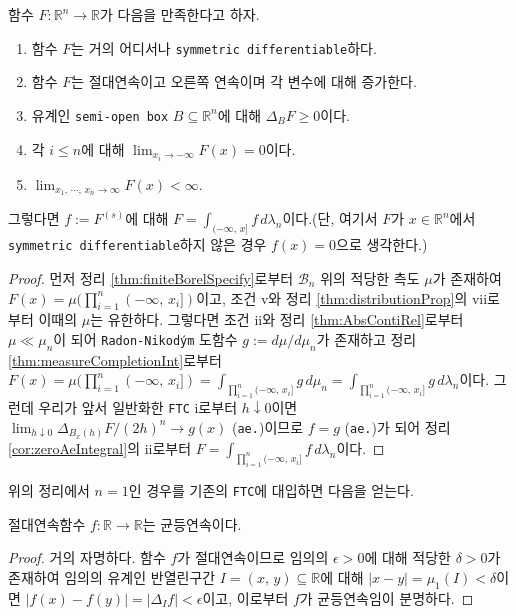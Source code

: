 \begin{theorem}\label{thm:FTC2}
    함수 $F:\mathbb{R}^n\to\mathbb{R}$가 다음을 만족한다고 하자.
    \begin{enumerate}
        \item 함수 $F$는 거의 어디서나 \texttt{symmetric differentiable}하다.
        \item 함수 $F$는 절대연속이고 오른쪽 연속이며 각 변수에 대해 증가한다.
        \item 유계인 \texttt{semi-open box} $B\subseteq\mathbb{R}^n$에 대해 $\Delta_BF\geq0$이다.
        \item 각 $i\leq n$에 대해 $\lim_{x_i\to-\infty}F(x)=0$이다.
        \item $\lim_{x_1,\,\cdots,\,x_n\to\infty}F(x)<\infty$.
    \end{enumerate}
    그렇다면 $f:=F^{(s)}$에 대해 $F=\int_{(-\infty,\,x]}f\,d\lambda_n$이다.(단, 여기서 $F$가 $x\in\mathbb{R}^n$에서 \texttt{symmetric differentiable}하지 않은 경우 $f(x)=0$으로 생각한다.)
\end{theorem}

\begin{proof}
    먼저 정리 \ref{thm:finiteBorelSpecify}로부터 $\mathcal{B}_n$ 위의 적당한 측도 $\mu$가 존재하여 $F(x)=\mu(\prod_{i=1}^n(-\infty,\,x_i])$이고, 조건 v와 정리 \ref{thm:distributionProp}의 vii로부터 이때의 $\mu$는 유한하다. 그렇다면 조건 ii와 정리 \ref{thm:AbsContiRel}로부터 $\mu\ll\mu_n$이 되어 \texttt{Radon-Nikod\'ym} 도함수 $g:=d\mu/d\mu_n$가 존재하고 정리 \ref{thm:measureCompletionInt}로부터 $F(x)=\mu(\prod_{i=1}^n(-\infty,\,x_i])=\int_{\prod_{i=1}^n(-\infty,\,x_i]}g\,d\mu_n=\int_{\prod_{i=1}^n(-\infty,\,x_i]}g\,d\lambda_n$이다. 그런데 우리가 앞서 일반화한 \texttt{FTC} i로부터 $h\downarrow0$이면 $\lim_{h\downarrow0}\Delta_{B_x(h)}F/(2h)^n\to g(x)$ (\texttt{ae.})이므로 $f=g$ (\texttt{ae.})가 되어 정리 \ref{cor:zeroAeIntegral}의 ii로부터 $F=\int_{\prod_{i=1}^n(-\infty,\,x_i]}f\,d\lambda_n$이다.
\end{proof}

위의 정리에서 $n=1$인 경우를 기존의 \texttt{FTC}에 대입하면 다음을 얻는다.

\begin{proposition}
    절대연속함수 $f:\mathbb{R}\to\mathbb{R}$는 균등연속이다.
\end{proposition}

\begin{proof}
    거의 자명하다. 함수 $f$가 절대연속이므로 임의의 $\epsilon>0$에 대해 적당한 $\delta>0$가 존재하여 임의의 유계인 반열린구간 $I=(x,\,y)\subseteq\mathbb{R}$에 대해 $|x-y|=\mu_1(I)<\delta$이면 $|f(x)-f(y)|=|\Delta_If|<\epsilon$이고, 이로부터 $f$가 균등연속임이 분명하다.
\end{proof}


